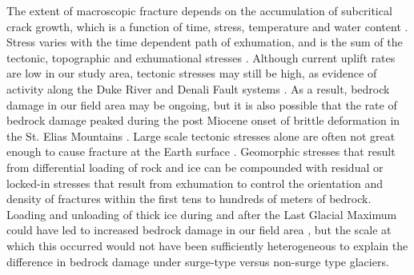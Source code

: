 \documentclass[draft,linenumbers]{agujournal}
\begin{document}
The extent of macroscopic fracture depends on the accumulation of subcritical crack growth, which is a function of time, stress, temperature and water content \citep[e.g.][]{Atkinson1984,Kemeny2003,Molnar2004}. Stress varies with the time dependent path of exhumation, and is the sum of the tectonic, topographic and exhumational stresses  \citep[e.g.][]{Leith2014a}. Although current uplift rates are low in our study area, tectonic stresses may still be high, as evidence of activity along the Duke River and Denali Fault systems \citep{Cobbett2016,Marechal2015}. As a result, bedrock damage in our field area may be ongoing, but it is also possible that the rate of bedrock damage peaked during the post Miocene onset of brittle deformation in the St. Elias Mountains \citep[e.g.][]{Eisbacher1977}. Large scale tectonic stresses alone are often not great enough to cause fracture at the Earth surface \citep{Leith2014a}. Geomorphic stresses that result from differential loading of rock and ice \citep[e.g.][]{Savage1986,Miller1996,Augustinus1995,Kinakin2005,Leith2014a,Molnar2004,Stead2004} can be compounded with residual or locked-in stresses that result from exhumation \citep[e.g.][]{Barrows2008} to control the orientation and density of fractures within the first tens to hundreds of meters of bedrock. Loading and unloading of thick ice during and after the Last Glacial Maximum could have led to increased bedrock damage in our field area \citep[e.g.][]{Eberhardt2004,Gramiger2017,Leith2014}, but the scale at which this occurred would not have been sufficiently heterogeneous to explain the difference in bedrock damage under surge-type versus non-surge type glaciers. 
\end{document}
